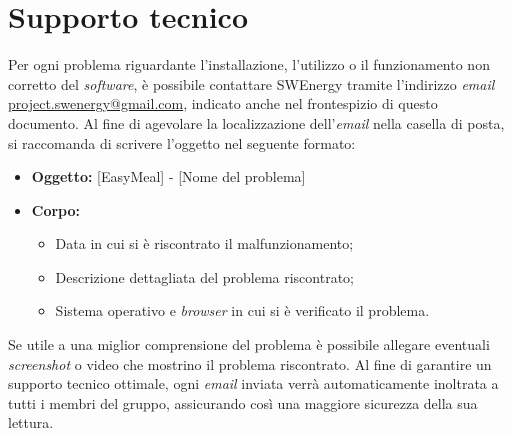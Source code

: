 \section{Supporto tecnico}
Per ogni problema riguardante l'installazione, l'utilizzo o il funzionamento non corretto del \textit{software}, è possibile contattare SWEnergy tramite 
l'indirizzo \textit{email} \href{mailto:project.swenergy@gmail.com}{project.swenergy@gmail.com}, indicato anche nel frontespizio di questo documento. 
Al fine di agevolare la localizzazione dell'\textit{email} nella casella di posta, si raccomanda di scrivere l'oggetto nel seguente formato:
\begin{itemize}
    \item \textbf{Oggetto:} [EasyMeal] - [Nome del problema]
    \item \textbf{Corpo:} 
    \begin{itemize}
        \item Data in cui si è riscontrato il malfunzionamento;
        \item Descrizione dettagliata del problema riscontrato;
        \item Sistema operativo e \textit{browser} in cui si è verificato il problema.
    \end{itemize}
\end{itemize}

Se utile a una miglior comprensione del problema è possibile allegare eventuali \textit{screenshot} o video che mostrino il problema riscontrato. 
Al fine di garantire un supporto tecnico ottimale, ogni \textit{email} inviata verrà automaticamente inoltrata a tutti i membri del gruppo, assicurando così una 
maggiore sicurezza della sua lettura.